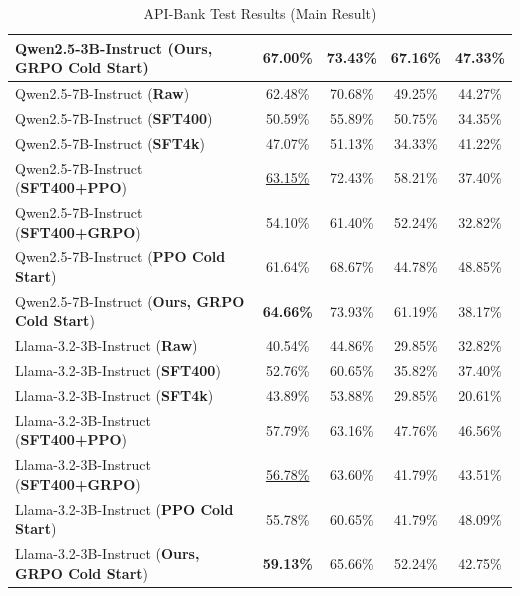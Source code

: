 \begin{table}[!t]
\begin{minipage}[t]{0.51\linewidth}
{\begin{tabular}{lcccc}
Qwen2.5-3B-Instruct (\textbf{Ours, GRPO Cold Start}) & \textbf{67.00\%} & 73.43\% & 67.16\% & 47.33\% \\
\midrule
Qwen2.5-7B-Instruct (\textbf{Raw}) & 62.48\% & 70.68\% & 49.25\% & 44.27\% \\
Qwen2.5-7B-Instruct (\textbf{SFT400}) & 50.59\% & 55.89\% & 50.75\% & 34.35\% \\
Qwen2.5-7B-Instruct (\textbf{SFT4k}) & 47.07\% & 51.13\% & 34.33\%&41.22\% \\
Qwen2.5-7B-Instruct (\textbf{SFT400+PPO}) & \uline{63.15\%} & 72.43\% & 58.21\% & 37.40\% \\
Qwen2.5-7B-Instruct (\textbf{SFT400+GRPO}) & 54.10\% & 61.40\% & 52.24\% &32.82\% \\
Qwen2.5-7B-Instruct (\textbf{PPO Cold Start}) & 61.64\% & 68.67\% & 44.78\% & 48.85\% \\
Qwen2.5-7B-Instruct (\textbf{Ours, GRPO Cold Start}) & \textbf{64.66\%} & 73.93\% & 61.19\% & 38.17\% \\
\midrule
Llama-3.2-3B-Instruct (\textbf{Raw}) & 40.54\% & 44.86\% & 29.85\% & 32.82\% \\
Llama-3.2-3B-Instruct (\textbf{SFT400}) & 52.76\% & 60.65\% & 35.82\% & 37.40\% \\
Llama-3.2-3B-Instruct (\textbf{SFT4k}) & 43.89\% & 53.88\% & 29.85\% & 20.61\% \\
Llama-3.2-3B-Instruct (\textbf{SFT400+PPO}) & 57.79\% & 63.16\% & 47.76\% & 46.56\% \\
Llama-3.2-3B-Instruct (\textbf{SFT400+GRPO}) & \uline{56.78\%} & 63.60\% & 41.79\% & 43.51\% \\
Llama-3.2-3B-Instruct (\textbf{PPO Cold Start}) & 55.78\% & 60.65\% & 41.79\% & 48.09\% \\
Llama-3.2-3B-Instruct (\textbf{Ours, GRPO Cold Start}) & \textbf{59.13\%} & 65.66\% & 52.24\% & 42.75\% \\
\bottomrule
\end{tabular}
}
\caption{API-Bank Test Results (Main Result)}
\label{tab:apibank-result-main}


\end{minipage}
\end{table}
